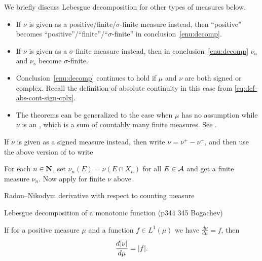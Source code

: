 We briefly discuss Lebesgue decomposition for other types of measures below.
\begin{itemize}
    \item If $\nu$ is given as a positive/finite/$\sigma$-finite measure instead, then ``positive'' becomes ``positive''/``finite''/``$\sigma$-finite'' in conclusion~\ref{enu:decomp}.
    \item If $\nu$ is given as a $\sigma$-finite measure instead, then in conclusion~\ref{enu:decomp} $\nu_a$ and $\nu_s$ become $\sigma$-finite.
    \item Conclusion~\ref{enu:decomp} continues to hold if $\mu$ and $\nu$ are both signed or complex. Recall the definition of absolute continuity in this case from \eqref{eq:def-abs-cont-sign-cplx}.
    \item The theorems can be generalized to the case when $\mu$ has no assumption while $\nu$ is an , which is a sum of countably many finite measures. See \cite{Falkner_2019}.
\end{itemize}
\begin{rem}
    
    If $\nu$ is given as a signed measure instead, then write $\nu = \nu^+ - \nu^-$, and then use the above version of  to write
    
    For each $n\in \mathbf{N}$, set $\nu_n (E) = \nu(E\cap X_n)$ for all $E\in \mathcal{A}$ and get a finite measure $\nu_n$. Now apply  for finite $\nu$ above
\end{rem}

Radon--Nikodym derivative with respect to counting measure

Lebesgue decomposition of a monotonic function (p344 345 Bogachev) %

\begin{namedthm}
    
\end{namedthm}

\begin{prop} \label{prop:derivative-ttl-var-meas}
    If for a positive measure $\mu$ and a function $f \in L^1(\mu)$ we have $\frac{d\nu}{d\mu} = f$, then \[
        \frac{d\lvert \nu \rvert}{d\mu} = \lvert f \rvert.
    \]
\end{prop}


